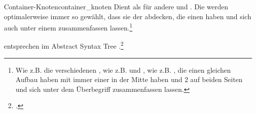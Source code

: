 \begin{Definition}{Container-Knoten}{container_knoten}
  Dient als  für andere  und . Die  werden optimalerweise immer so gewählt, dass sie  der  abdecken, die einen  haben und sich auch unter einem  zusammenfassen lassen.\footnote{Wie z.B. die verschiedenen , wie z.B.  und , wie z.B. , die einen gleichen Aufbau haben mit immer einer  in der Mitte haben und $2$  auf beiden Seiten und sich unter dem Überbegriff  zusammenfassen lassen.}

   entsprechen im Abstract Syntax Tree .\footcite{thiemann_compilerbau_2021}
\end{Definition}

